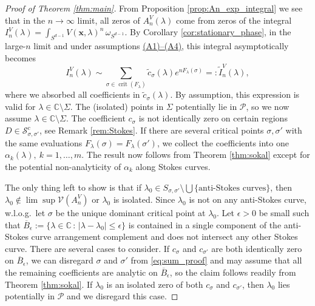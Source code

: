 \documentclass[11pt, a4paper]{article}
\numberwithin{theorem}{section}
\theoremstyle{remark}
\newcommand{\CC}{\mathbb{C}}
\DeclareMathOperator{\crit}{crit}
\newcommand{\V}{\mathcal{V}}
\newcommand{\cS}{\mathcal{S}}
\newcommand{\cP}{\mathcal{P}}
\newcommand{\bb}[1]{\boldsymbol{#1}}
\theoremstyle{theorem}
\begin{document}
\begin{proof}[Proof of Theorem \ref{thm:main}]
  From Proposition \ref{prop:An_exp_integral} we see that in the $n\to\infty$ limit, all zeros of $A_n^V(\lambda)$ come from zeros of the integral $I_n^V(\lambda) = \int_{S^{d-1}} V(\bb{x},\lambda)^{n} \,\omega_{S^{d-1}}$. 
  By Corollary \ref{cor:stationary_phase}, in the large-$n$ limit and under assumptions \hyperref[ass:A1]{(A1)--(A4)}, this integral asymptotically becomes
  \begin{equation}
    \label{eq:sum_proof}
    I_n^V(\lambda) \sim \sum_{\sigma \in \crit(F_\lambda)} \tilde{c}_{\sigma}(\lambda) e^{nF_{\lambda}(\sigma)} =: \tilde{I}_n^V(\lambda),
  \end{equation}
  where we absorbed all coefficients in $\tilde{c}_{\sigma}(\lambda)$. By assumption, this expression is valid for $\lambda\in \CC\setminus \Sigma$. The (isolated) points in $\Sigma$ potentially lie in $\cP$, so we now assume $\lambda\in \CC\setminus \Sigma$. The coefficient $c_\sigma$ is not identically zero on certain regions $D \in \cS^c_{\sigma,\sigma'}$, see Remark \ref{rem:Stokes}. If there are several critical points $\sigma,\sigma'$ with the same evaluations $F_\lambda(\sigma) = F_\lambda(\sigma')$, we collect the coefficients into one $\alpha_k(\lambda),~k=1,\dots,m$. 
  The result now follows from Theorem \ref{thm:sokal} except for the potential non-analyticity of $\alpha_k$ along Stokes curves.\par
  The only thing left to show is that if $\lambda_0\in S_{\sigma,\sigma'} \setminus \bigcup \{\text{anti-Stokes curves}\}$, then $\lambda_0 \notin \lim\sup\V(A_n^V)$ or $\lambda_0$ is isolated. Since $\lambda_0$ is not on any anti-Stokes curve, w.l.o.g.\ let $\sigma$ be the unique dominant critical point at $\lambda_0$. 
  Let $\epsilon > 0$ be small such that $\overline{B}_\epsilon := \{\lambda\in\CC \,:\, |\lambda - \lambda_0| \leq \epsilon\}$ is contained in a single component of the anti-Stokes curve arrangement complement and does not intersect any other Stokes curve. 
  There are several cases to consider. 
  If $c_\sigma$ and $c_{\sigma'}$ are both identically zero on $\overline{B}_\epsilon$, we can disregard $\sigma$ and $\sigma'$ from \eqref{eq:sum_proof} and may assume that all the remaining coefficients are analytic on $\overline{B}_\epsilon$, so the claim follows readily from Theorem \ref{thm:sokal}.
  If $\lambda_0$ is an isolated zero of both $c_\sigma$ and $c_{\sigma'}$, then $\lambda_0$ lies potentially in $\cP$ and we disregard this case. \par

\end{proof}
\end{document}
